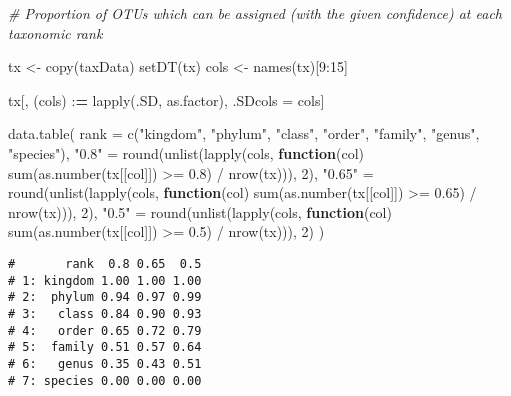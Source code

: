 \documentclass[
]{article}
\newenvironment{Shaded}{\begin{snugshade}}{\end{snugshade}}
\newcommand{\AttributeTok}[1]{\textcolor[rgb]{0.77,0.63,0.00}{#1}}
\newcommand{\CommentTok}[1]{\textcolor[rgb]{0.56,0.35,0.01}{\textit{#1}}}
\newcommand{\ControlFlowTok}[1]{\textcolor[rgb]{0.13,0.29,0.53}{\textbf{#1}}}
\newcommand{\DecValTok}[1]{\textcolor[rgb]{0.00,0.00,0.81}{#1}}
\newcommand{\ErrorTok}[1]{\textcolor[rgb]{0.64,0.00,0.00}{\textbf{#1}}}
\newcommand{\FloatTok}[1]{\textcolor[rgb]{0.00,0.00,0.81}{#1}}
\newcommand{\FunctionTok}[1]{\textcolor[rgb]{0.00,0.00,0.00}{#1}}
\newcommand{\NormalTok}[1]{#1}
\newcommand{\OtherTok}[1]{\textcolor[rgb]{0.56,0.35,0.01}{#1}}
\newcommand{\SpecialCharTok}[1]{\textcolor[rgb]{0.00,0.00,0.00}{#1}}
\newcommand{\StringTok}[1]{\textcolor[rgb]{0.31,0.60,0.02}{#1}}
\begin{document}
\begin{Shaded}
\begin{Highlighting}[]
\CommentTok{\# Proportion of OTUs which can be assigned (with the given confidence) at each taxonomic rank}

\NormalTok{tx }\OtherTok{\textless{}{-}} \FunctionTok{copy}\NormalTok{(taxData)}
\FunctionTok{setDT}\NormalTok{(tx)}
\NormalTok{cols }\OtherTok{\textless{}{-}} \FunctionTok{names}\NormalTok{(tx)[}\DecValTok{9}\SpecialCharTok{:}\DecValTok{15}\NormalTok{]}

\NormalTok{tx[, (cols) }\SpecialCharTok{:}\ErrorTok{=} \FunctionTok{lapply}\NormalTok{(.SD, as.factor), .SDcols }\OtherTok{=}\NormalTok{ cols]}

\FunctionTok{data.table}\NormalTok{(}
  \AttributeTok{rank =} \FunctionTok{c}\NormalTok{(}\StringTok{"kingdom"}\NormalTok{, }\StringTok{"phylum"}\NormalTok{, }\StringTok{"class"}\NormalTok{, }\StringTok{"order"}\NormalTok{, }\StringTok{"family"}\NormalTok{, }\StringTok{"genus"}\NormalTok{, }\StringTok{"species"}\NormalTok{),}
  \StringTok{"0.8"} \OtherTok{=} \FunctionTok{round}\NormalTok{(}\FunctionTok{unlist}\NormalTok{(}\FunctionTok{lapply}\NormalTok{(cols, }\ControlFlowTok{function}\NormalTok{(col) }\FunctionTok{sum}\NormalTok{(}\FunctionTok{as.number}\NormalTok{(tx[[col]]) }\SpecialCharTok{\textgreater{}=} \FloatTok{0.8}\NormalTok{) }\SpecialCharTok{/} \FunctionTok{nrow}\NormalTok{(tx))), }\DecValTok{2}\NormalTok{),}
  \StringTok{"0.65"} \OtherTok{=} \FunctionTok{round}\NormalTok{(}\FunctionTok{unlist}\NormalTok{(}\FunctionTok{lapply}\NormalTok{(cols, }\ControlFlowTok{function}\NormalTok{(col) }\FunctionTok{sum}\NormalTok{(}\FunctionTok{as.number}\NormalTok{(tx[[col]]) }\SpecialCharTok{\textgreater{}=} \FloatTok{0.65}\NormalTok{) }\SpecialCharTok{/} \FunctionTok{nrow}\NormalTok{(tx))), }\DecValTok{2}\NormalTok{),}
  \StringTok{"0.5"} \OtherTok{=} \FunctionTok{round}\NormalTok{(}\FunctionTok{unlist}\NormalTok{(}\FunctionTok{lapply}\NormalTok{(cols, }\ControlFlowTok{function}\NormalTok{(col) }\FunctionTok{sum}\NormalTok{(}\FunctionTok{as.number}\NormalTok{(tx[[col]]) }\SpecialCharTok{\textgreater{}=} \FloatTok{0.5}\NormalTok{) }\SpecialCharTok{/} \FunctionTok{nrow}\NormalTok{(tx))), }\DecValTok{2}\NormalTok{)}
\NormalTok{)}
\end{Highlighting}
\end{Shaded}

\begin{verbatim}
#       rank  0.8 0.65  0.5
# 1: kingdom 1.00 1.00 1.00
# 2:  phylum 0.94 0.97 0.99
# 3:   class 0.84 0.90 0.93
# 4:   order 0.65 0.72 0.79
# 5:  family 0.51 0.57 0.64
# 6:   genus 0.35 0.43 0.51
# 7: species 0.00 0.00 0.00
\end{verbatim}
\end{document}
